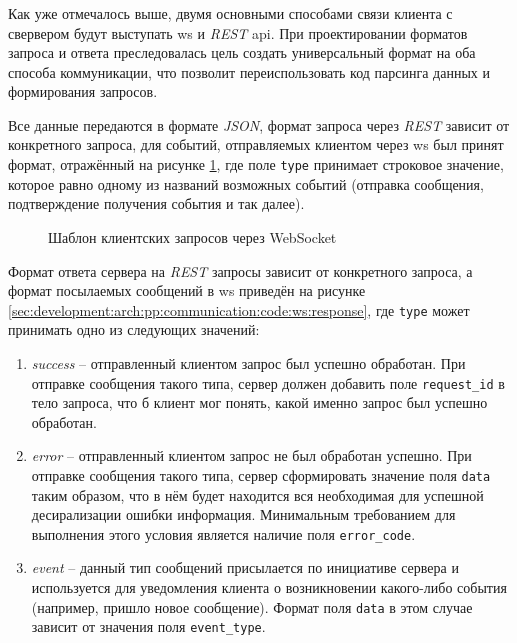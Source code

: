 \subsubsection{}
\label{sec:development:arch:pp:communication}

Как уже отмечалось выше, двумя основными способами связи клиента с свервером будут выступать \gls{ws} и \textit{REST} \gls{api}. При проектировании форматов запроса и ответа преследовалась цель создать универсальный формат на оба способа коммуникации, что позволит переиспользовать код парсинга данных и формирования запросов.

Все данные передаются в формате \textit{JSON}, формат запроса через \textit{REST} зависит от конкретного запроса, для событий, отправляемых клиентом через \gls{ws} был принят формат, отражённый на рисунке \ref{sec:development:arch:pp:communication:code:ws:request}, где поле \texttt{type} принимает строковое значение, которое равно одному из названий возможных событий (отправка сообщения, подтверждение получения события и так далее).

\begin{figure}[h]
	
   \caption{Шаблон клиентских запросов через WebSocket}
   \label{sec:development:arch:pp:communication:code:ws:request}
\end{figure}

Формат ответа сервера на \textit{REST} запросы зависит от конкретного запроса, а формат посылаемых сообщений в \gls{ws} приведён на рисунке \ref{sec:development:arch:pp:communication:code:ws:response}, где \texttt{type} может принимать одно из следующих значений: 

\begin{enumerate}
	\item \textit{success} -- отправленный клиентом запрос был успешно обработан. При отправке сообщения такого типа, сервер должен добавить поле \texttt{request\_id} в тело запроса, что б клиент мог понять, какой именно запрос был успешно обработан.
	\item \textit{error} -- отправленный клиентом запрос не был обработан успешно. При отправке сообщения такого типа, сервер сформировать значение поля \texttt{data} таким образом, что в нём будет находится вся необходимая для успешной десирализации ошибки информация. Минимальным требованием для выполнения этого условия является наличие поля \texttt{error\_code}.
	\item \textit{event} -- данный тип сообщений присылается по инициативе сервера и используется для уведомления клиента о возникновении какого-либо события (например, пришло новое сообщение). Формат поля \texttt{data} в этом случае зависит от значения поля \texttt{event\_type}.
\end{enumerate}


